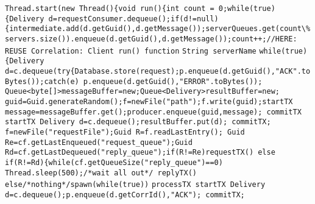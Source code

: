 \lstinline{Thread.start(new Thread(){void run(){int count = 0;while(true){Delivery d=requestConsumer.dequeue();if(d!=null){intermediate.add(d.getGuid(),d.getMessage());serverQueues.get(count\%servers.size()).enqueue(d.getGuid(),d.getMessage());count++;//HERE: REUSE Correlation: Client run() function}
\bluetext{+}
\lstinline{String serverName}
\lstinline{while(true){Delivery d=c.dequeue(try{Database.store(request);p.enqueue(d.getGuid(),"ACK".toBytes());catch(e) p.enqueue(d.getGuid(),"ERROR".toBytes());}
%
%
%
\bluetext{+}
\lstinline{Queue<byte[]>messageBuffer=new;Queue<Delivery>resultBuffer=new;}
\lstinline{guid=Guid.generateRandom();f=newFile("path");f.write(guid);startTX message=messageBuffer.get();producer.enqueue(guid,message); commitTX}
\lstinline{startTX Delivery d=c.dequeue();resultBuffer.put(d); commitTX;}
\lstinline{f=newFile("requestFile");Guid R=f.readLastEntry(); Guid Re=cf.getLastEnqueued("request_queue");Guid Rd=cf.getLastDequeued("reply_queue");if(R!=Re)requestTX() else if(R!=Rd){while(cf.getQueueSize("reply_queue")==0) Thread.sleep(500);/*wait all out*/ replyTX() else/*nothing*/spawn(while(true))}
\lstinline{processTX startTX Delivery d=c.dequeue();p.enqueue(d.getCorrId(),"ACK"); commitTX;}